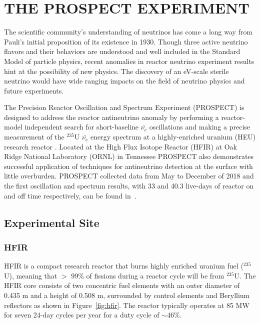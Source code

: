 \chapter{THE PROSPECT EXPERIMENT}

The scientific community's understanding of neutrinos has come a long way from Pauli's initial proposition of its existence in 1930. 
Though three active neutrino flavors and their behaviors are understood and well included in the Standard Model of particle physics, recent anomalies in reactor neutrino experiment results hint at the possibility of new physics. 
The discovery of an eV-scale sterile neutrino would have wide ranging impacts on the field of neutrino physics and future experiments.

The Precision Reactor Oscillation and Spectrum Experiment (PROSPECT) is designed to address the reactor antineutrino anomaly by performing a reactor-model independent search for short-baseline $\bar{\nu_{e}}$ oscillations and making a precise measurement of the $^{235}$U $\bar{\nu_{e}}$ energy spectrum at a highly-enriched uranium (HEU) research reactor \cite{LongNIM}.
Located at the High Flux Isotope Reactor (HFIR) at Oak Ridge National Laboratory (ORNL) in Tennessee PROSPECT also demonstrates successful application of techniques for antineutrino detection at the surface with little overburden. 
PROSPECT collected data from May to December of 2018 and the first oscillation and spectrum results, with 33 and 40.3 live-days of reactor on and off time respectively, can be found in~\cite{PhysRevLett.121.251802,Ashenfelter:2018jrx}.

\section{Experimental Site}
\subsection{HFIR}

HFIR is a compact research reactor that burns highly enriched uranium fuel ($^{235}$U), meaning that $>$ 99\% of fissions during a reactor cycle will be from $^{235}$U.
The HFIR core consists of two concentric fuel elements with an outer diameter of 0.435 m and a height of 0.508 m, surrounded by control elements and Beryllium reflectors as shown in Figure~\ref{fig:hfir}. 
The reactor typically operates at 85 MW for seven 24-day cycles per year for a duty cycle of $\sim$46\%.

